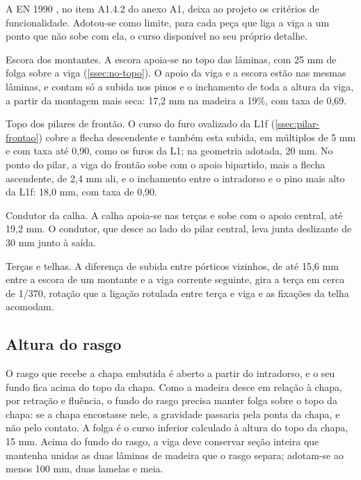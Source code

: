 A EN 1990 \cite{EN1990:2002}, no item A1.4.2 do anexo A1, deixa ao projeto os
critérios de funcionalidade. Adotou-se como limite, para cada peça que liga a
viga a um ponto que não sobe com ela, o curso disponível no seu próprio detalhe.

\begin{alineas}
    \item Escora dos montantes. A escora apoia-se no topo das lâminas, com 25 mm
          de folga sobre a viga (\autoref{ssec:no-topo}). O apoio da viga e a
          escora estão nas mesmas lâminas, e contam só a subida nos pinos e o
          inchamento de toda a altura da viga, a partir da montagem mais seca:
          17,2 mm na madeira a 19\%, com taxa de 0,69.
    \item Topo dos pilares de frontão. O curso do furo ovalizado da L1f
          (\autoref{ssec:pilar-frontao}) cobre a flecha descendente e também esta
          subida, em múltiplos de 5 mm e com taxa até 0,90, como os furos da L1; na
          geometria adotada, 20 mm. No ponto do pilar, a viga do
          frontão sobe com o apoio bipartido, mais a flecha ascendente, de 2,4 mm
          ali, e o inchamento entre o intradorso e o pino mais alto da L1f:
          18,0 mm, com taxa de 0,90.
    \item Condutor da calha. A calha apoia-se nas terças e sobe com o apoio
          central, até 19,2 mm. O condutor, que desce ao lado do pilar central,
          leva junta deslizante de 30 mm junto à saída.
    \item Terças e telhas. A diferença de subida entre pórticos vizinhos, de até
          15,6 mm entre a escora de um montante e a viga corrente seguinte, gira a
          terça em cerca de 1/370, rotação que a ligação rotulada entre terça e
          viga e as fixações da telha acomodam.
\end{alineas}

\subsection{Altura do rasgo}\label{ssec:altura-rasgo}

O rasgo que recebe a chapa embutida é aberto a partir do intradorso, e o seu
fundo fica acima do topo da chapa. Como a madeira desce em relação à chapa, por
retração e fluência, o fundo do rasgo precisa manter folga sobre o topo da
chapa: se a chapa encostasse nele, a gravidade passaria pela ponta da chapa, e
não pelo contato. A folga é o curso inferior calculado à altura do topo da
chapa, 15 mm. Acima do fundo do rasgo, a viga deve conservar seção inteira que
mantenha unidas as duas lâminas de madeira que o rasgo separa; adotam-se ao
menos 100 mm, duas lamelas e meia.

